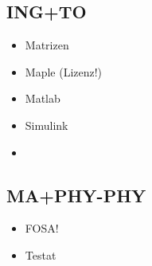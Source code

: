 \subsection{ING+TO}
\begin{itemize}
  \item Matrizen
  \item Maple (Lizenz!)
  \item Matlab
  \item Simulink
  \item 
\end{itemize}

\subsection{MA+PHY-PHY}
\begin{itemize}
  \item FOSA!
  \item Testat
\end{itemize}
